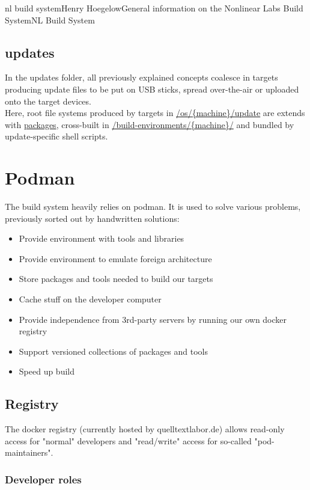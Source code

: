 \documentclass[11pt]{article}
\begin{document}
\begin{Name}{1}{nl build system}{Henry Hoegelow}{General information on the Nonlinear Labs Build System}{NL Build System}
\subsection{updates}
In the updates folder, all previously explained concepts coalesce in targets producing update files to be put on USB sticks, spread over-the-air or uploaded onto the target devices.\\
Here, root file systems produced by targets in \hyperref[os-update]{/os/\{machine\}/update} are extends with \hyperref[packages]{packages}, cross-built in \hyperref[buildenv]{/build-environments/\{machine\}/} and bundled by update-specific shell scripts.

\section{Podman} \label{pod}
The build system heavily relies on podman. It is used to solve various problems, previously sorted out by handwritten solutions:
\begin{itemize}
\item Provide environment with tools and libraries
\item Provide environment to emulate foreign architecture
\item Store packages and tools needed to build our targets
\item Cache stuff on the developer computer
\item Provide independence from 3rd-party servers by running our own docker registry
\item Support versioned collections of packages and tools
\item Speed up build
\end{itemize}

\subsection{Registry}
The docker registry (currently hosted by quelltextlabor.de) allows read-only access for "normal" developers and "read/write" access for so-called "pod-maintainers".

\subsubsection{Developer roles}

\end{Name}
\end{document}

